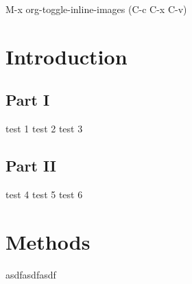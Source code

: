 \documentclass[12pt,oneside,a4paper,english]{abntex2}
\begin{document}
M-x org-toggle-inline-images (C-c C-x C-v)

\section{Introduction}
\label{sec:org43e0daa}
\subsection{Part I}
\label{sec:orgb22c524}
test 1
test 2
test 3

\subsection{Part II}
\label{sec:orgc299b81}
test 4
test 5
test 6

\section{Methods}
\label{sec:org8daffab}
asdfasdfasdf
\end{document}
